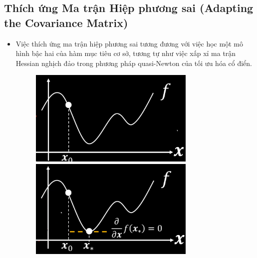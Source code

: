 \documentclass{book}
\begin{document}
\subsection{Thích ứng Ma trận Hiệp phương sai (Adapting the Covariance Matrix)}
    \begin{itemize}
        \item Việc thích ứng ma trận hiệp phương sai tương đương với việc học một mô hình bậc hai của hàm mục tiêu cơ sở, tương tự như việc xấp xỉ ma trận Hessian nghịch đảo trong phương pháp quasi-Newton của tối ưu hóa cổ điển.
        \begin{figure}[H]
            \centering %
            \begin{minipage}[c]{0.45\textwidth}
                \centering
                \includegraphics[width=0.75\textwidth]{images/adapting_the_covariance_matrix_1.png}
            \end{minipage}\hfill %
            \begin{minipage}[c]{0.45\textwidth}
                \centering
                \includegraphics[width=0.75\textwidth]{images/adapting_the_covariance_matrix_2.png}
            \end{minipage}
        \end{figure}
        \begin{equation*}

\end{equation*}
\end{itemize}
\end{document}

